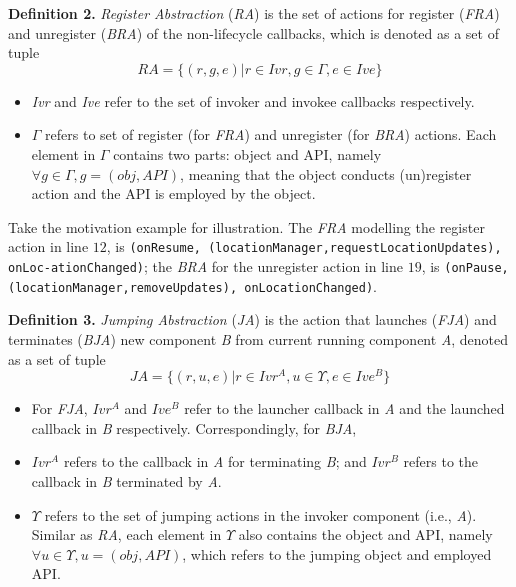\textbf{Definition 2.} \textit{Register Abstraction} (\textit{RA}) is the set of actions for register (\textit{FRA}) and unregister (\textit{BRA}) of the non-lifecycle callbacks, which is denoted as a set of tuple
\begin{equation}
RA = \{( r, g, e) |r\in Ivr, g\in \Gamma, e\in Ive\}
\end{equation}
\begin{itemize}
\item \textit{Ivr} and \textit{Ive} refer to the set of invoker and invokee callbacks respectively.
\item $\Gamma$ refers to set of register (for \textit{FRA}) and unregister (for \textit{BRA}) actions. Each element in $\Gamma$ contains two parts: object and API, namely $\forall g \in \Gamma, g = (obj, API)$, meaning that the object conducts (un)register action and the API is employed by the object.
\end{itemize}

Take the motivation example for illustration. The \textit{FRA} modelling the register action in line $12$, is \texttt{(onResume,\linebreak
(locationManager,requestLocationUpdates), onLoc-\linebreak ationChanged)}; the \textit{BRA} for the unregister action in line $19$, is \texttt{(onPause,(locationManager,removeUpdates), onLocationChanged)}.



\textbf{Definition 3.} \textit{Jumping Abstraction} (\textit{JA}) is the action that launches (\textit{FJA}) and terminates (\textit{BJA}) new component \textit{B} from current running component \textit{A}, denoted as a set of tuple 
\begin{equation}
JA = \{( r, u, e )| r\in Ivr^{A}, u\in \Upsilon, e\in Ive^{B}\}
\end{equation}
\begin{itemize}
\item For \textit{FJA}, $Ivr^{A}$ and $Ive^{B}$ refer to the launcher callback in \textit{A} and the launched callback in \textit{B} respectively.
Correspondingly, for \textit{BJA}, \item $Ivr^{A}$ refers to the callback in \textit{A} for terminating \textit{B}; and $Ivr^{B}$ refers to the callback in \textit{B} terminated by \textit{A}.
\item $ \Upsilon$ refers to the set of jumping actions in the invoker component (i.e., \textit{A}). Similar as \textit{RA}, each element in $\Upsilon$ also contains the object and API, namely $\forall u\in \Upsilon, u = (obj, API)$, which refers to the jumping object and employed API.
\end{itemize}

